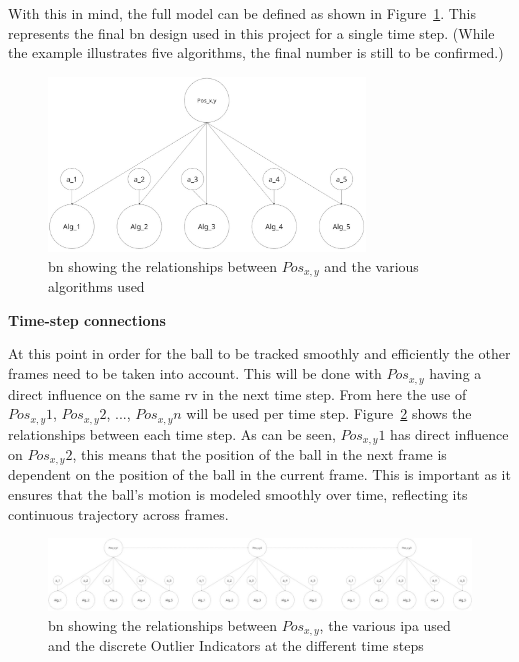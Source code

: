 \documentclass[12pt,a4paper]{article}
\begin{document}
With this in mind, the full model can be defined as shown in Figure~\ref{fig:fullBN}. This represents the final \acs{bn} design used in this project for a single time step. (While the example illustrates five algorithms, the final number is still to be confirmed.)

\begin{figure}[H]
	\centering
	\includegraphics[width=0.75\textwidth]{fullBN.jpg}
	\caption{\acl{bn} showing the relationships between $Pos_{x,y}$ and the various algorithms used}
	\label{fig:fullBN}
\end{figure}

\textbf{Time-step connections}

At this point in order for the ball to be tracked smoothly and efficiently the other frames need to be taken into account. This will be done with $Pos_{x,y}$ having a direct influence on the same \acs{rv} in the next time step. From here the use of $Pos_{x,y}1$, $Pos_{x,y}2$, ..., $Pos_{x,y}n$ will be used per time step. Figure~\ref{fig:fulltimeBN} shows the relationships between each time step. As can be seen, $Pos_{x,y}1$ has direct influence on $Pos_{x,y}2$, this means that the position of the ball in the next frame is dependent on the position of the ball in the current frame. This is important as it ensures that the ball's motion is modeled smoothly over time, reflecting its continuous trajectory across frames.
 
 \begin{figure}[H]
 	\centering
 	\includegraphics[width=1\textwidth]{BNwtime.jpg}
 	\caption{\acl{bn} showing the relationships between $Pos_{x,y}$, the various \acs{ipa} used and the discrete Outlier Indicators at the different time steps}
 	\label{fig:fulltimeBN}
 \end{figure}
\end{document}
